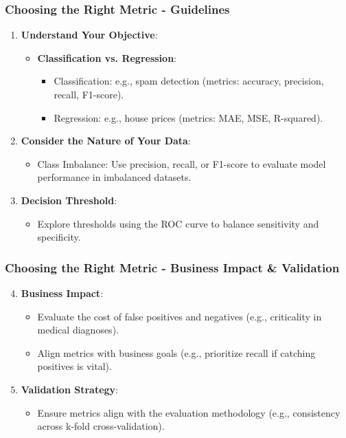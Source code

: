 \documentclass[aspectratio=169]{beamer}
\begin{document}
\begin{frame}[fragile]
    \frametitle{Choosing the Right Metric - Guidelines}
    \begin{enumerate}
        \item \textbf{Understand Your Objective}:
            \begin{itemize}
                \item \textbf{Classification vs. Regression}:
                    \begin{itemize}
                        \item Classification: e.g., spam detection (metrics: accuracy, precision, recall, F1-score).
                        \item Regression: e.g., house prices (metrics: MAE, MSE, R-squared).
                    \end{itemize}
            \end{itemize}
        
        \item \textbf{Consider the Nature of Your Data}:
            \begin{itemize}
                \item Class Imbalance: Use precision, recall, or F1-score to evaluate model performance in imbalanced datasets.
            \end{itemize}
        
        \item \textbf{Decision Threshold}: 
            \begin{itemize}
                \item Explore thresholds using the ROC curve to balance sensitivity and specificity.
            \end{itemize}
    \end{enumerate}
\end{frame}

\begin{frame}[fragile]
    \frametitle{Choosing the Right Metric - Business Impact & Validation}
    \begin{enumerate}
        \setcounter{enumi}{3}
        \item \textbf{Business Impact}:
            \begin{itemize}
                \item Evaluate the cost of false positives and negatives (e.g., criticality in medical diagnoses).
                \item Align metrics with business goals (e.g., prioritize recall if catching positives is vital).
            \end{itemize}
        
        \item \textbf{Validation Strategy}:
            \begin{itemize}
                \item Ensure metrics align with the evaluation methodology (e.g., consistency across k-fold cross-validation).
            \end{itemize}
    \end{enumerate}
\end{frame}
\end{document}
